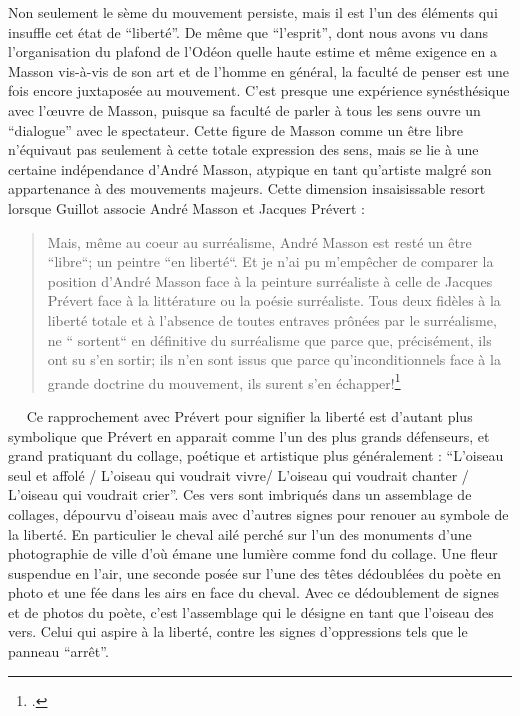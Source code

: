 	Non seulement le sème du mouvement persiste, mais il est l’un des éléments qui insuffle cet état de \enquote{liberté}. De même que \enquote{l’esprit}, dont nous avons vu dans l’organisation du plafond de l’Odéon quelle haute estime et même exigence en a Masson vis-à-vis de son art et de l’homme en général, la faculté de penser est une fois encore juxtaposée au mouvement. C’est presque une expérience synésthésique avec l’\oe{}uvre de Masson, puisque sa faculté de parler à tous les sens ouvre un \enquote{dialogue} avec le spectateur. Cette figure de Masson comme un être libre n’équivaut pas seulement à cette totale expression des sens, mais se lie à une certaine indépendance d’André Masson, atypique en tant qu’artiste malgré son appartenance à des mouvements majeurs. Cette dimension insaisissable resort lorsque Guillot associe André Masson et Jacques Prévert : 
\begin{quote}
Mais, même au coeur au surréalisme, André Masson est resté un être “libre“; un peintre “en liberté“. Et je n’ai pu m’empêcher de comparer la position d’André Masson face à la peinture surréaliste à celle de Jacques Prévert face à la littérature ou la poésie surréaliste. Tous deux fidèles à la liberté totale et à l’absence de toutes entraves prônées par le surréalisme, ne “ sortent“ en définitive du surréalisme que parce que, précisément, ils ont su s’en sortir; ils n’en sont issus que parce qu’inconditionnels face à la grande doctrine du mouvement, ils surent s’en échapper!\footcite{massonlyon}\end{quote}
  
Ce rapprochement avec Prévert pour signifier la liberté est d’autant plus symbolique que Prévert en apparait comme l’un des plus grands défenseurs, et grand pratiquant du collage, poétique et artistique plus généralement : \enquote{L’oiseau seul et affolé / L’oiseau qui voudrait vivre/ L’oiseau qui voudrait chanter / L’oiseau qui voudrait crier}. Ces vers sont imbriqués dans un assemblage de collages, dépourvu d’oiseau mais avec d’autres signes pour renouer au symbole de la liberté. En particulier le cheval ailé perché sur l’un des monuments d’une photographie de ville d’où émane une lumière comme fond du collage. Une fleur suspendue en l’air, une seconde posée sur l’une des têtes dédoublées du poète en photo et une fée dans les airs en face du cheval. Avec ce dédoublement de signes et de photos du poète, c’est l’assemblage qui le désigne en tant que l’oiseau des vers. Celui qui aspire à la liberté, contre les signes d’oppressions tels que le panneau \enquote{arrêt}. 

